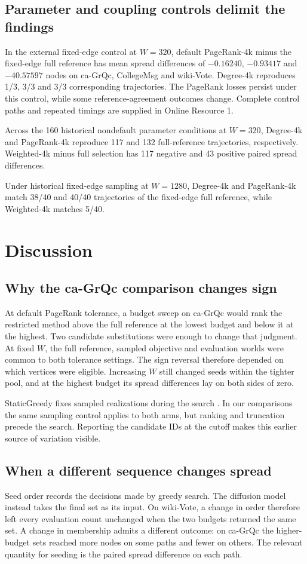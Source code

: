 \documentclass[smallextended]{svjour3}
\begin{document}
\subsection{Parameter and coupling controls delimit the findings}

In the external fixed-edge control at $W=320$, default PageRank-4k minus the fixed-edge full reference has mean spread differences of $-0.16240$, $-0.93417$ and $-40.57597$ nodes on ca-GrQc, CollegeMsg and wiki-Vote. Degree-4k reproduces 1/3, 3/3 and 3/3 corresponding trajectories. The PageRank losses persist under this control, while some reference-agreement outcomes change. Complete control paths and repeated timings are supplied in Online Resource 1.

Across the 160 historical nondefault parameter conditions at $W=320$, Degree-4k and PageRank-4k reproduce 117 and 132 full-reference trajectories, respectively. Weighted-4k minus full selection has 117 negative and 43 positive paired spread differences.

Under historical fixed-edge sampling at $W=1280$, Degree-4k and PageRank-4k match 38/40 and 40/40 trajectories of the fixed-edge full reference, while Weighted-4k matches 5/40.
\FloatBarrier

\section{Discussion}
\subsection{Why the ca-GrQc comparison changes sign}
At default PageRank tolerance, a budget sweep on ca-GrQc would rank the restricted method above the full reference at the lowest budget and below it at the highest. Two candidate substitutions were enough to change that judgment. At fixed $W$, the full reference, sampled objective and evaluation worlds were common to both tolerance settings. The sign reversal therefore depended on which vertices were eligible. Increasing $W$ still changed seeds within the tighter pool, and at the highest budget its spread differences lay on both sides of zero.

StaticGreedy fixes sampled realizations during the search \cite{ref8}. In our comparisons the same sampling control applies to both arms, but ranking and truncation precede the search. Reporting the candidate IDs at the cutoff makes this earlier source of variation visible.

\subsection{When a different sequence changes spread}
Seed order records the decisions made by greedy search. The diffusion model instead takes the final set as its input. On wiki-Vote, a change in order therefore left every evaluation count unchanged when the two budgets returned the same set. A change in membership admits a different outcome: on ca-GrQc the higher-budget sets reached more nodes on some paths and fewer on others. The relevant quantity for seeding is the paired spread difference on each path.
\end{document}
